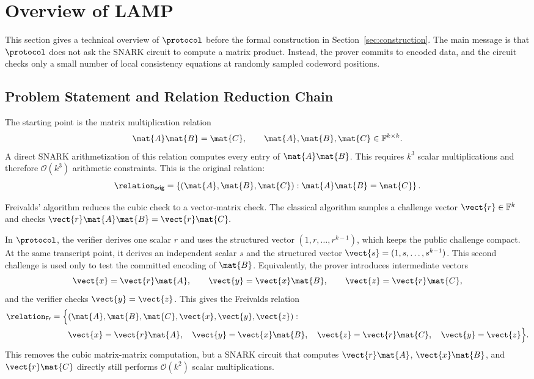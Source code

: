 \section{Overview of LAMP}
\label{sec:tech-overview}

This section gives a technical overview of \(\protocol\) before the formal
construction in Section~\ref{sec:construction}.  The main message is that
\(\protocol\) does not ask the SNARK circuit to compute a matrix product.
Instead, the prover commits to encoded data, and the circuit checks only a
small number of local consistency equations at randomly sampled codeword
positions.

\subsection{Problem Statement and Relation Reduction Chain}
\label{sec:overview-reduction-chain}

The starting point is the matrix multiplication relation
\[
  \mat{A}\mat{B}=\mat{C},
  \qquad
  \mat{A},\mat{B},\mat{C}\in\mathbb{F}^{k\times k}.
\]
A direct SNARK arithmetization of this relation computes every entry of
\(\mat{A}\mat{B}\).  This requires \(k^3\) scalar multiplications and therefore
\(\mathcal{O}(k^3)\) arithmetic constraints.  This is the original relation:
\[
\relation_{\mathsf{orig}}
=
\left\{
(\mat{A},\mat{B},\mat{C}) :
\mat{A}\mat{B}=\mat{C}
\right\}.
\]

Freivalds' algorithm reduces the cubic check to a vector-matrix check.  The
classical algorithm samples a challenge vector \(\vect{r}\in\mathbb{F}^k\) and checks
  $\vect{r}\mat{A}\mat{B}
  =
  \vect{r}\mat{C}.$
  
In \(\protocol\), the verifier derives one scalar \(r\) and uses the structured
vector \((1,r,\ldots,r^{k-1})\), which keeps the public challenge compact.
At the same transcript point, it derives an independent scalar \(s\) and the
structured vector \(\vect{s}=(1,s,\ldots,s^{k-1})\).  This second challenge is
used only to test the committed encoding of \(\mat{B}\).
Equivalently, the prover introduces intermediate vectors
\[
  \vect{x}=\vect{r}\mat{A},
  \qquad
  \vect{y}=\vect{x}\mat{B},
  \qquad
  \vect{z}=\vect{r}\mat{C},
\]
and the verifier checks \(\vect{y}=\vect{z}\).  This gives the Freivalds
relation
\[
\begin{aligned}
\relation_{\mathsf{Fr}}
=
\Big\{
&(\mat{A},\mat{B},\mat{C},\vect{x},\vect{y},\vect{z}) :
\\
&\vect{x}=\vect{r}\mat{A},\quad
  \vect{y}=\vect{x}\mat{B},\quad
  \vect{z}=\vect{r}\mat{C},\quad
  \vect{y}=\vect{z}
\Big\}.
\end{aligned}
\]
This removes the cubic matrix-matrix computation, but a SNARK circuit that
computes \(\vect{r}\mat{A}\), \(\vect{x}\mat{B}\), and \(\vect{r}\mat{C}\)
directly still performs \(\mathcal{O}(k^2)\) scalar multiplications.

